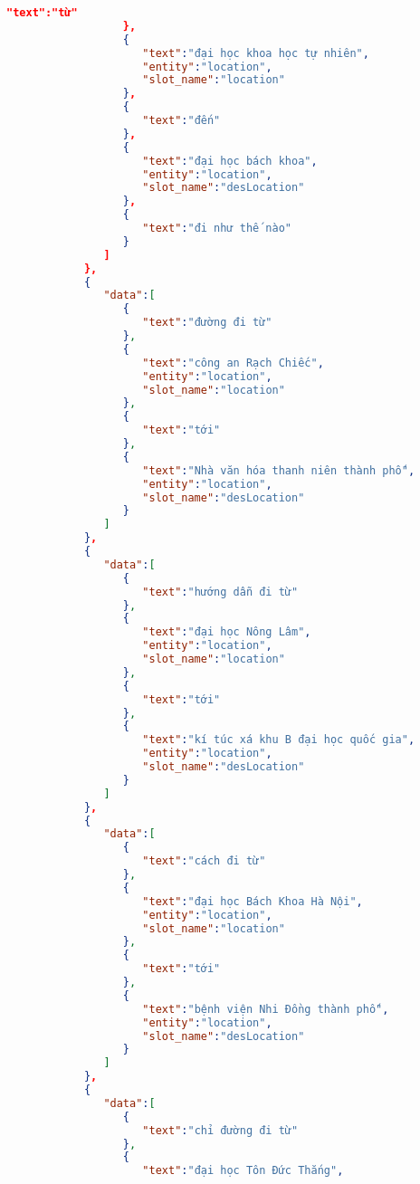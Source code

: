\begin{lstlisting}[language=json,firstnumber=1]
                     "text":"từ"
                  },
                  {
                     "text":"đại học khoa học tự nhiên",
                     "entity":"location",
                     "slot_name":"location"
                  },
                  {
                     "text":"đến"
                  },
                  {
                     "text":"đại học bách khoa",
                     "entity":"location",
                     "slot_name":"desLocation"
                  },
                  {
                     "text":"đi như thế nào"
                  }
               ]
            },
            {
               "data":[
                  {
                     "text":"đường đi từ"
                  },
                  {
                     "text":"công an Rạch Chiếc",
                     "entity":"location",
                     "slot_name":"location"
                  },
                  {
                     "text":"tới"
                  },
                  {
                     "text":"Nhà văn hóa thanh niên thành phố",
                     "entity":"location",
                     "slot_name":"desLocation"
                  }
               ]
            },
            {
               "data":[
                  {
                     "text":"hướng dẫn đi từ"
                  },
                  {
                     "text":"đại học Nông Lâm",
                     "entity":"location",
                     "slot_name":"location"
                  },
                  {
                     "text":"tới"
                  },
                  {
                     "text":"kí túc xá khu B đại học quốc gia",
                     "entity":"location",
                     "slot_name":"desLocation"
                  }
               ]
            },
            {
               "data":[
                  {
                     "text":"cách đi từ"
                  },
                  {
                     "text":"đại học Bách Khoa Hà Nội",
                     "entity":"location",
                     "slot_name":"location"
                  },
                  {
                     "text":"tới"
                  },
                  {
                     "text":"bệnh viện Nhi Đồng thành phố",
                     "entity":"location",
                     "slot_name":"desLocation"
                  }
               ]
            },
            {
               "data":[
                  {
                     "text":"chỉ đường đi từ"
                  },
                  {
                     "text":"đại học Tôn Đức Thắng",

\end{lstlisting}
